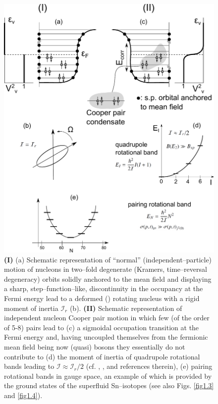  
\begin{figure}
\centerline{\includegraphics*[width=\textwidth,angle=0]{nutshell/figs/fig1A3.pdf}}
\caption{\textbf{(I)} (a) Schematic representation of ``normal'' (independent--particle) motion of nucleons in  two--fold degenerate (Kramers, time--reversal degeneracy) orbits solidly anchored to the mean field and  displaying a sharp, step--function--like, discontinuity in the occupancy at the Fermi energy  lead to a deformed  (\cite{Nilsson:55}) rotating nucleus with a rigid moment of inertia $\mathcal{I}_r$ (b). \textbf{(II)} Schematic representation of independent nucleon Cooper pair  motion in which few (of the order of 5-8) pairs lead to (c) a sigmoidal occupation transition at the Fermi energy and, having uncoupled themselves from the fermionic mean field being now (quasi) bosons they essentially do not  contribute to (d) the moment of inertia of quadrupole rotational bands leading to $\mathcal{I}\approx\mathcal{I}_r/2$ (cf. \cite{Belyaev:13}, \cite{Belyaev:59}, \cite{Bohr:75} and references therein), (e) pairing rotational bands in gauge space, an example of which is  provided by the ground states of the superfluid Sn--isotopes (see also Figs. \ref{fig1.3} and \ref{fig1.4}).}\label{fig1A3}
\end{figure}
